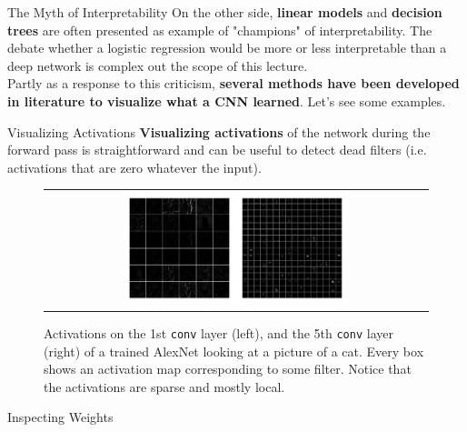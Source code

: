 \documentclass[aspectratio=169]{beamer}
\begin{document}

\begin{frame}{The Myth of Interpretability}
On the other side, \textbf{linear models} and \textbf{decision trees} are often presented as example of "champions" of interpretability. The debate whether a logistic regression would be more or less interpretable than a deep network is complex out the scope of this lecture.\\
\vspace{0.5cm}
Partly as a response to this criticism, \textbf{several methods have been developed in literature to visualize what a CNN learned}. Let's see some examples.
\end{frame}


\begin{frame}{Visualizing Activations}
\textbf{Visualizing activations} of the network during the forward pass is straightforward and can be useful to detect dead filters (i.e. activations that are zero whatever the input).%
\begin{figure}
\begin{tabular}{c}
\includegraphics[width=0.6\textwidth]{img/cnn/visualize_activation.png} 
\end{tabular}
\caption{Activations on the 1st \texttt{conv} layer (left), and the 5th \texttt{conv} layer (right) of a trained AlexNet looking at a picture of a cat. Every box shows an activation map corresponding to some filter. Notice that the activations are sparse and mostly local.}
\end{figure}
\end{frame}


\begin{frame}{Inspecting Weights}

\end{frame}
\end{document}
